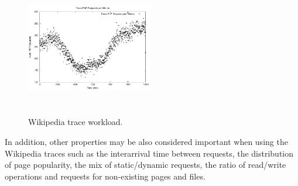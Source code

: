 



\begin{figure}
\begin{center}
\includegraphics[width=0.49\textwidth, height=6cm]{./images/traceWorkload}
\end{center}
\caption{Wikipedia trace workload.}
\label{workload}
\end{figure}

In addition, other properties may be also considered important when using the Wikipedia traces such as the interarrival time between requests, the distribution of page popularity, the mix of static/dynamic requests, the ratio of read/write operations and requests for non-existing pages and files.




